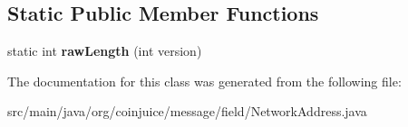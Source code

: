 \subsection*{Static Public Member Functions}
\begin{DoxyCompactItemize}
\item 
\hypertarget{classorg_1_1coinjuice_1_1message_1_1field_1_1_network_address_a4dac8026d85fa0eef3209c5506061569}{static int {\bfseries raw\-Length} (int version)}\label{classorg_1_1coinjuice_1_1message_1_1field_1_1_network_address_a4dac8026d85fa0eef3209c5506061569}

\end{DoxyCompactItemize}


The documentation for this class was generated from the following file\-:\begin{DoxyCompactItemize}
\item 
src/main/java/org/coinjuice/message/field/Network\-Address.\-java\end{DoxyCompactItemize}
